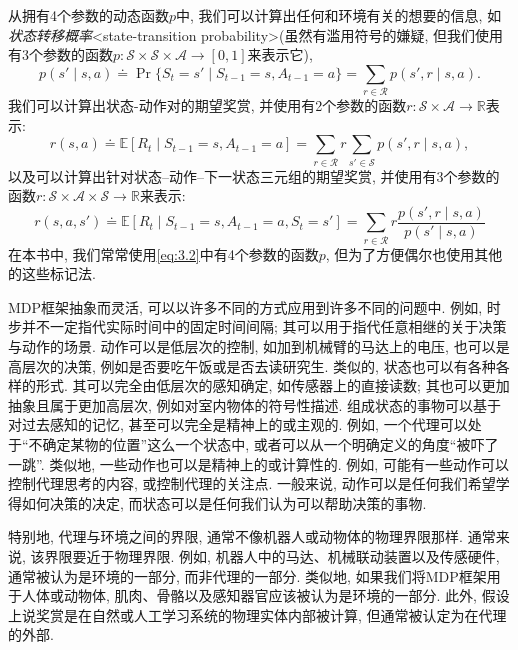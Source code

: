 从拥有4个参数的动态函数$p$中, 我们可以计算出任何和环境有关的想要的信息, 如\emph{状态转移概率}<state-transition probability>(虽然有滥用符号的嫌疑, 但我们使用有3个参数的函数$p: \mathcal{S} \times \mathcal{S} \times \mathcal{A} \rightarrow [0, 1]$来表示它),
\begin{equation}\label{eq:3.4}
p(s' \mid s, a) \doteq \operatorname{Pr}\{ S_t = s' \mid S_{t - 1} = s, A_{t - 1} = a \} = \sum_{r \in \mathcal{R}}p(s', r \mid s, a).
\end{equation}
我们可以计算出状态-动作对的期望奖赏, 并使用有2个参数的函数$r: \mathcal{S} \times \mathcal{A} \rightarrow \mathbb{R}$表示:
\begin{equation}\label{eq:3.5}
r(s, a) \doteq \mathbb{E}[R_t \mid S_{t - 1} = s, A_{t - 1} = a] = \sum_{r \in \mathcal{R}}r\sum_{s' \in \mathcal{S}}p(s', r \mid s, a),
\end{equation}
以及可以计算出针对状态--动作--下一状态三元组的期望奖赏, 并使用有3个参数的函数$r: \mathcal{S} \times \mathcal{A} \times \mathcal{S} \rightarrow \mathbb{R}$来表示:
\begin{equation}\label{eq:3.6}
r(s, a, s') \doteq \mathbb{E}[R_t \mid S_{t - 1} = s, A_{t - 1} = a, S_t = s'] = \sum_{r \in \mathcal{R}} r \frac{p(s', r \mid s, a)}{p(s' \mid s, a)} 
\end{equation}
在本书中, 我们常常使用\eqref{eq:3.2}中有4个参数的函数$p$, 但为了方便偶尔也使用其他的这些标记法.

MDP框架抽象而灵活, 可以以许多不同的方式应用到许多不同的问题中. 例如, 时步并不一定指代实际时间中的固定时间间隔; 其可以用于指代任意相继的关于决策与动作的场景. 动作可以是低层次的控制, 如加到机械臂的马达上的电压, 也可以是高层次的决策, 例如是否要吃午饭或是否去读研究生. 类似的, 状态也可以有各种各样的形式. 其可以完全由低层次的感知确定, 如传感器上的直接读数; 其也可以更加抽象且属于更加高层次, 例如对室内物体的符号性描述. 组成状态的事物可以基于对过去感知的记忆, 甚至可以完全是精神上的或主观的. 例如, 一个代理可以处于``不确定某物的位置''这么一个状态中, 或者可以从一个明确定义的角度``被吓了一跳''. 类似地, 一些动作也可以是精神上的或计算性的. 例如, 可能有一些动作可以控制代理思考的内容, 或控制代理的关注点. 一般来说, 动作可以是任何我们希望学得如何决策的决定, 而状态可以是任何我们认为可以帮助决策的事物. 

特别地, 代理与环境之间的界限, 通常不像机器人或动物体的物理界限那样. 通常来说, 该界限要近于物理界限. 例如, 机器人中的马达、机械联动装置以及传感硬件, 通常被认为是环境的一部分, 而非代理的一部分. 类似地, 如果我们将MDP框架用于人体或动物体, 肌肉、骨骼以及感知器官应该被认为是环境的一部分. 此外, 假设上说奖赏是在自然或人工学习系统的物理实体内部被计算, 但通常被认定为在代理的外部.

